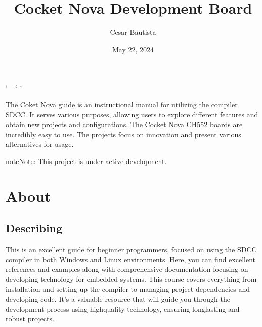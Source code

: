 \documentclass[letterpaper,10pt,english]{sphinxmanual}
\title{Cocket Nova Development Board}
\date{May 22, 2024}
\author{Cesar Bautista}
\begin{document}
\ifdefined\shorthandoff
  \ifnum\catcode`\=\string=\active\shorthandoff{=}\fi
  \ifnum\catcode`\"=\active{}\fi
\fi

\pagestyle{empty}
\sphinxmaketitle
\pagestyle{plain}
\sphinxtableofcontents
\pagestyle{normal}
\label{\detokenize{index::doc}}


\sphinxAtStartPar
{}

\sphinxAtStartPar
The Coket Nova guide is an instructional manual for utilizing the compiler SDCC. It serves various purposes, allowing users to explore different features and obtain new projects and
configurations.
The Cocket Nova CH552 boards are incredibly easy to use. The projects focus on innovation and
present various alternatives for usage.


\begin{sphinxadmonition}{note}{Note:}
\sphinxAtStartPar
This project is under active development.
\end{sphinxadmonition}

\sphinxstepscope


\chapter{About}
\label{\detokenize{about:about}}\label{\detokenize{about::doc}}

\section{Describing}
\label{\detokenize{about:describing}}
\sphinxAtStartPar
This is an excellent guide for beginner programmers, focused on using the SDCC compiler in both Windows and Linux environments.
Here, you can find excellent references and examples along with comprehensive documentation focusing on developing technology for embedded systems.
This course covers everything from installation and setting up the compiler to managing project dependencies and developing code. It’s a valuable resource that will guide you through the development process using high\sphinxhyphen{}quality technology, ensuring long\sphinxhyphen{}lasting and robust projects.
\begin{quote}

\end{quote}
\end{document}

